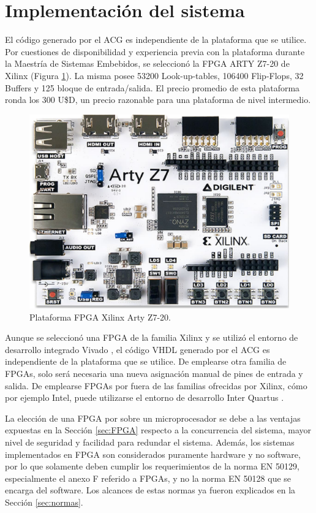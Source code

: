 \section{Implementación del sistema}
	\label{sec:AGG}
	
	El código generado por el ACG es independiente de la plataforma que se utilice. Por cuestiones de disponibilidad y experiencia previa con la plataforma durante la Maestría de Sistemas Embebidos, se seleccionó la FPGA ARTY Z7-20 de Xilinx (Figura \ref{fig:FPGA}). La misma posee 53200 Look-up-tables, 106400 Flip-Flops, 32 Buffers y 125 bloque de entrada/salida. El precio promedio de esta plataforma ronda los 300 U\$D, un precio razonable para una plataforma de nivel intermedio.	
	
	\begin{figure}[H]
		\centering
		\includegraphics[width=1\textwidth]{Figuras/FPGA}
		\centering\caption{Plataforma FPGA Xilinx Arty Z7-20.}
		\label{fig:FPGA}
	\end{figure}
	
	Aunque se seleccionó una FPGA de la familia Xilinx y se utilizó el entorno de desarrollo integrado Vivado \cite{VIVADO}, el código VHDL generado por el ACG es independiente de la plataforma que se utilice. De emplearse otra familia de FPGAs, solo será necesaria una nueva asignación manual de pines de entrada y salida. De emplearse FPGAs por fuera de las familias ofrecidas por Xilinx, cómo por ejemplo Intel, puede utilizarse el entorno de desarrollo Inter Quartus \cite{QUARTUS}.
	
	La elección de una FPGA por sobre un microprocesador se debe a las ventajas expuestas en la Sección \ref{sec:FPGA} respecto a la concurrencia del sistema, mayor nivel de seguridad y facilidad para redundar el sistema. Además, los sistemas implementados en FPGA son considerados puramente hardware y no software, por lo que solamente deben cumplir los requerimientos de la norma EN 50129, especialmente el anexo F referido a FPGAs, y no la norma EN 50128 que se encarga del software. Los alcances de estas normas ya fueron explicados en la Sección \ref{sec:normas}.